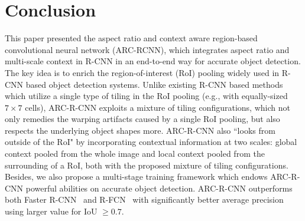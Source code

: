 \documentclass[10pt,twocolumn,letterpaper]{article}
\begin{document}
\vspace{-2mm}
\section{Conclusion}
\vspace{-1mm}
This paper presented the aspect ratio and context aware  region-based convolutional neural network (ARC-RCNN), which integrates aspect ratio and multi-scale context in R-CNN in an end-to-end way for accurate object detection. The key idea is to enrich the region-of-interest (RoI) pooling widely used in R-CNN based object detection systems.  Unlike existing R-CNN based methods which utilize a single type of tiling in the RoI pooling (e.g., with equally-sized $7\times 7$ cells), ARC-R-CNN exploits a mixture of tiling configurations, which not only remedies the warping artifacts caused by a single RoI pooling, but also respects the underlying object shapes more. ARC-R-CNN also ``looks from outside of the RoI" by incorporating contextual information at two scales: global context pooled from the whole image  and local context pooled from the surrounding of a RoI, both with the proposed mixture of tiling configurations. 
Besides, we also propose a multi-stage training framework which endows ARC-R-CNN powerful abilities on accurate object detection.
ARC-R-CNN outperforms both Faster R-CNN~\cite{faster_rcnn} and R-FCN~\cite{rfcn} with significantly better average precision using larger value for IoU $\ge 0.7$. 


\begin{table*} 
\begin{center}
\end{center}
\caption{Detailed results with IoU $\ge 0.5$ of Faster-RCNN, R-FCN and ARC-FCN on PASCAL VOC 2007 test set.}
\label{tab:07coarse-supp} 
\end{table*}
\end{document}
